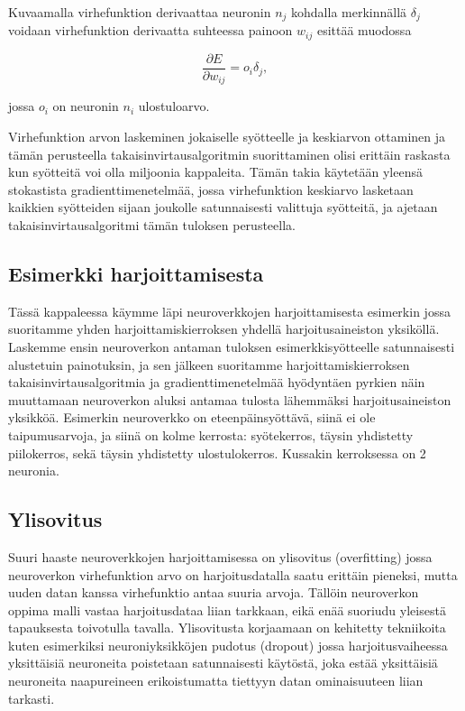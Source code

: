 \documentclass[finnish]{tktltiki2}
\theoremstyle{definition}
\theoremstyle{remark}
\begin{document}
  Kuvaamalla virhefunktion derivaattaa neuronin $n_j$ kohdalla merkinnällä $\delta_j$ voidaan virhefunktion derivaatta suhteessa painoon $w_{ij}$ esittää muodossa 

    $$ \frac{\partial E}{\partial w_{ij}} = o_i\delta_j,$$

  jossa $o_i$ on neuronin $n_i$ ulostuloarvo.

  Virhefunktion arvon laskeminen jokaiselle syötteelle ja keskiarvon ottaminen ja tämän perusteella takaisinvirtausalgoritmin suorittaminen olisi erittäin raskasta kun syötteitä voi olla miljoonia kappaleita. Tämän takia käytetään yleensä stokastista gradienttimenetelmää, jossa virhefunktion keskiarvo lasketaan kaikkien syötteiden sijaan joukolle satunnaisesti valittuja syötteitä, ja ajetaan takaisinvirtausalgoritmi tämän tuloksen perusteella.

  \subsection{Esimerkki harjoittamisesta}
  Tässä kappaleessa käymme läpi neuroverkkojen harjoittamisesta esimerkin jossa suoritamme yhden harjoittamiskierroksen yhdellä harjoitusaineiston yksiköllä. Laskemme ensin neuroverkon antaman tuloksen esimerkkisyötteelle satunnaisesti alustetuin painotuksin, ja sen jälkeen suoritamme harjoittamiskierroksen takaisinvirtausalgoritmia ja gradienttimenetelmää hyödyntäen pyrkien näin muuttamaan neuroverkon aluksi antamaa tulosta lähemmäksi harjoitusaineiston yksikköä. Esimerkin neuroverkko on eteenpäinsyöttävä, siinä ei ole taipumusarvoja, ja siinä on kolme kerrosta: syötekerros, täysin yhdistetty piilokerros, sekä täysin yhdistetty ulostulokerros. Kussakin kerroksessa on 2 neuronia. 
  
  \subsection{Ylisovitus}

  Suuri haaste neuroverkkojen harjoittamisessa on ylisovitus (overfitting) jossa neuroverkon virhefunktion arvo on harjoitusdatalla saatu erittäin pieneksi, mutta uuden datan kanssa virhefunktio antaa suuria arvoja. Tällöin neuroverkon oppima malli vastaa harjoitusdataa liian tarkkaan, eikä enää suoriudu yleisestä tapauksesta toivotulla tavalla. Ylisovitusta korjaamaan on kehitetty tekniikoita kuten esimerkiksi neuroniyksikköjen pudotus (dropout) jossa harjoitusvaiheessa yksittäisiä neuroneita poistetaan satunnaisesti käytöstä, joka estää yksittäisiä neuroneita naapureineen erikoistumatta tiettyyn datan ominaisuuteen liian tarkasti.
\end{document}

